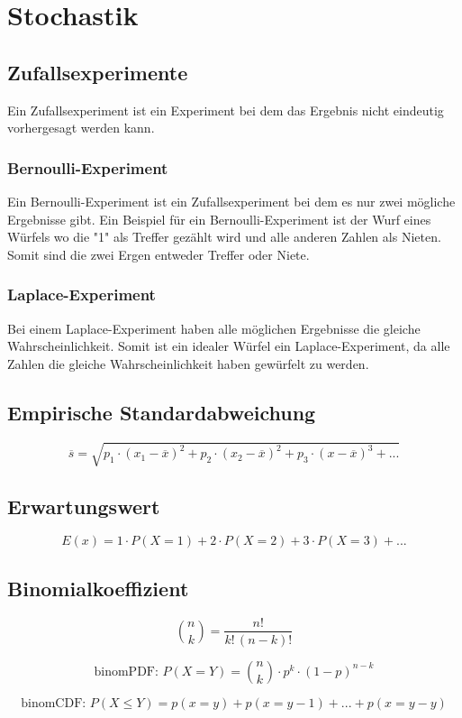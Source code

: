 \section{Stochastik}
	\subsection{Zufallsexperimente}
	Ein Zufallsexperiment ist ein Experiment bei dem das Ergebnis nicht eindeutig vorhergesagt werden kann.
	\subsubsection{Bernoulli-Experiment}
	Ein Bernoulli-Experiment ist ein Zufallsexperiment bei dem es nur zwei mögliche Ergebnisse gibt. Ein Beispiel für ein Bernoulli-Experiment ist der Wurf eines Würfels wo die "1" als Treffer gezählt wird und alle anderen Zahlen als Nieten. Somit sind die zwei Ergen entweder Treffer oder Niete.
	\subsubsection{Laplace-Experiment}
	Bei einem Laplace-Experiment haben alle möglichen Ergebnisse die gleiche Wahrscheinlichkeit. Somit ist ein idealer Würfel ein Laplace-Experiment, da alle Zahlen die gleiche Wahrscheinlichkeit haben gewürfelt zu werden.
	\subsection{Empirische Standardabweichung}
		$$ \overline{s} = \sqrt{p_{1} \cdot (x_{1}-\overline{x})^{2}+p_{2} \cdot (x_{2}-\overline{x})^{2}+p_{3} \cdot (x-\overline{x})^{3}+...} $$
	\subsection{Erwartungswert}
		$$ E(x) = 1 \cdot P(X = 1) + 2 \cdot P(X = 2) + 3 \cdot P(X = 3) + ... $$
	\subsection{Binomialkoeffizient}
$$
\binom{n}{k} =  \frac{n!}{k!\,(n-k)!}
$$

$$
\text{binomPDF: } P(X=Y) = \binom{n}{k} \cdot p^{k} \cdot (1-p)^{n-k}
$$

$$
\text{binomCDF: } P(X\leq Y) = p(x=y) + p(x=y-1) + ... + p(x=y-y)
$$
